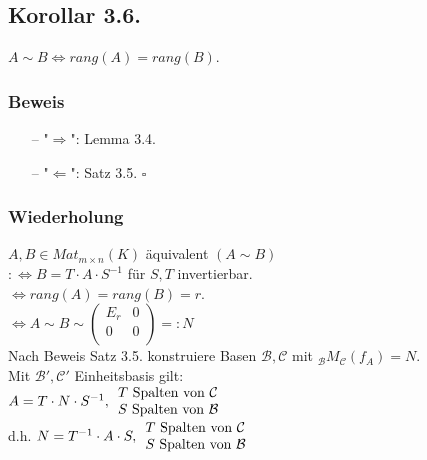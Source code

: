 \documentclass[a4paper, 12pt]{extarticle}
\newcommand{\tn}[1]{\textnormal {#1}}
\begin{document}
\subsection*{Korollar 3.6.}
$A \sim B \Leftrightarrow rang(A) = rang(B)$.
\subsubsection*{Beweis}
\begin{itemize}
	\item[--] "$\Rightarrow$": Lemma 3.4.
	\item[--] "$\Leftarrow$": Satz 3.5. $\square$
\end{itemize}
\subsubsection*{Wiederholung}
$A,B \in Mat_{m \times n}(K)$ äquivalent $(A\sim B)$ \\
$ :\Leftrightarrow B = T \cdot A \cdot S^{-1}$ für $S, T$ invertierbar.\\
$\Leftrightarrow rang(A) = rang(B) = r$. \\
$\Leftrightarrow A \sim B \sim 
\left( \begin{matrix} 
E_r & 0 \\
0 & 0 \\
\end{matrix} \right) =: N$\\
Nach Beweis Satz 3.5. konstruiere Basen $\mathcal{B},\mathcal{C}$ mit $_\mathcal{B}M_\mathcal{C}(f_A) = N$.\\
Mit $\mathcal{B'}, \mathcal{C'}$ Einheitsbasis gilt:\\
$A = T \cdot N \cdot S^{-1}, \begin{array}{ll}
T \tn{ Spalten von } \mathcal{C}\\
S \tn{ Spalten von } \mathcal{B}\\
\end{array}
$\\
d.h. $N = T^{-1} \cdot A \cdot S,  \begin{array}{ll}
T \tn{ Spalten von } \mathcal{C}\\
S \tn{ Spalten von } \mathcal{B}\\
\end{array}$\\
\end{document}
